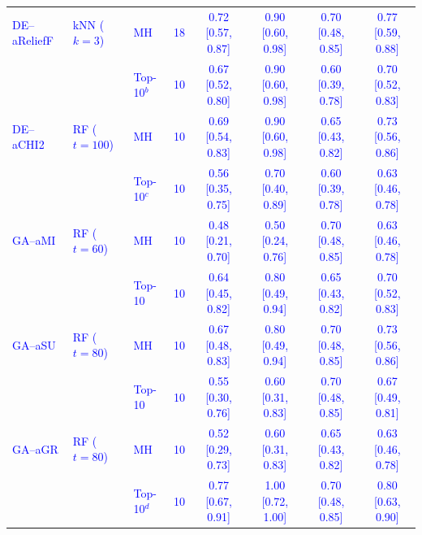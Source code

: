 \begin{table}[!ht]
{\begin{tabular}{llllcccc}
\textcolor{blue}{DE--aReliefF} & \textcolor{blue}{kNN ($k=3$)} & \textcolor{blue}{MH} & \textcolor{blue}{18} & \textcolor{blue}{0.72 [0.57, 0.87]} & \textcolor{blue}{0.90 [0.60, 0.98]} & \textcolor{blue}{0.70 [0.48, 0.85]} & \textcolor{blue}{0.77 [0.59, 0.88]} \\
 &  & \textcolor{blue}{Top-10$^{b}$} & \textcolor{blue}{10} & \textcolor{blue}{0.67 [0.52, 0.80]} & \textcolor{blue}{0.90 [0.60, 0.98]} & \textcolor{blue}{0.60 [0.39, 0.78]} & \textcolor{blue}{0.70 [0.52, 0.83]} \\
\textcolor{blue}{DE--aCHI2} & \textcolor{blue}{RF ($t=100$)} & \textcolor{blue}{MH} & \textcolor{blue}{10} & \textcolor{blue}{0.69 [0.54, 0.83]} & \textcolor{blue}{0.90 [0.60, 0.98]} & \textcolor{blue}{0.65 [0.43, 0.82]} & \textcolor{blue}{0.73 [0.56, 0.86]} \\
 &  & \textcolor{blue}{Top-10$^{c}$} & \textcolor{blue}{10} & \textcolor{blue}{0.56 [0.35, 0.75]} & \textcolor{blue}{0.70 [0.40, 0.89]} & \textcolor{blue}{0.60 [0.39, 0.78]} & \textcolor{blue}{0.63 [0.46, 0.78]} \\
\hline
\textcolor{blue}{GA--aMI} & \textcolor{blue}{RF ($t=60$)} & \textcolor{blue}{MH} & \textcolor{blue}{10} & \textcolor{blue}{0.48 [0.21, 0.70]} & \textcolor{blue}{0.50 [0.24, 0.76]} & \textcolor{blue}{0.70 [0.48, 0.85]} & \textcolor{blue}{0.63 [0.46, 0.78]} \\
 &  & \textcolor{blue}{Top-10} & \textcolor{blue}{10} & \textcolor{blue}{0.64 [0.45, 0.82]} & \textcolor{blue}{0.80 [0.49, 0.94]} & \textcolor{blue}{0.65 [0.43, 0.82]} & \textcolor{blue}{0.70 [0.52, 0.83]} \\
\textcolor{blue}{GA--aSU} & \textcolor{blue}{RF ($t=80$)} & \textcolor{blue}{MH} & \textcolor{blue}{10} & \textcolor{blue}{0.67 [0.48, 0.83]} & \textcolor{blue}{0.80 [0.49, 0.94]} & \textcolor{blue}{0.70 [0.48, 0.85]} & \textcolor{blue}{0.73 [0.56, 0.86]} \\
 &  & \textcolor{blue}{Top-10} & \textcolor{blue}{10} & \textcolor{blue}{0.55 [0.30, 0.76]} & \textcolor{blue}{0.60 [0.31, 0.83]} & \textcolor{blue}{0.70 [0.48, 0.85]} & \textcolor{blue}{0.67 [0.49, 0.81]} \\
\textcolor{blue}{GA--aGR} & \textcolor{blue}{RF ($t=80$)} & \textcolor{blue}{MH} & \textcolor{blue}{10} & \textcolor{blue}{0.52 [0.29, 0.73]} & \textcolor{blue}{0.60 [0.31, 0.83]} & \textcolor{blue}{0.65 [0.43, 0.82]} & \textcolor{blue}{0.63 [0.46, 0.78]} \\
 &  & \textcolor{blue}{Top-10$^{d}$} & \textcolor{blue}{10} & \textcolor{blue}{0.77 [0.67, 0.91]} & \textcolor{blue}{1.00 [0.72, 1.00]} & \textcolor{blue}{0.70 [0.48, 0.85]} & \textcolor{blue}{0.80 [0.63, 0.90]} \\

\end{tabular}}
\end{table}

